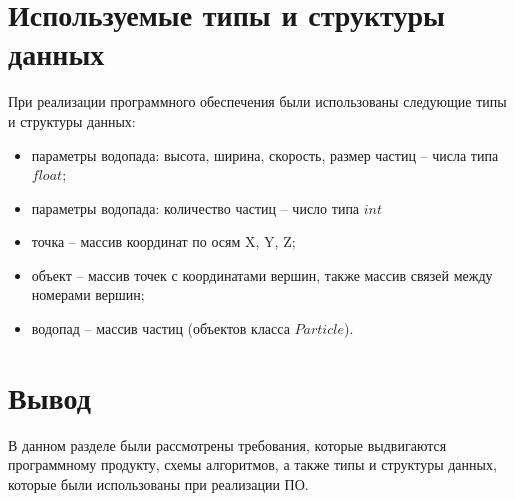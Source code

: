\section{Используемые типы и структуры данных}

При реализации программного обеспечения были использованы следующие типы и структуры данных:

\begin{itemize}
    \item параметры водопада: высота, ширина, скорость, размер частиц -- числа типа $float$;
    \item параметры водопада: количество частиц -- число типа $int$
    \item точка -- массив координат по осям X, Y, Z;
    \item объект -- массив точек с координатами вершин, также массив связей между номерами вершин;
    \item водопад -- массив частиц (объектов класса $Particle$).
\end{itemize}


\section*{Вывод}

В данном разделе были рассмотрены требования, которые выдвигаются программному продукту, схемы алгоритмов, а также типы и структуры данных, которые были использованы при реализации ПО. 

